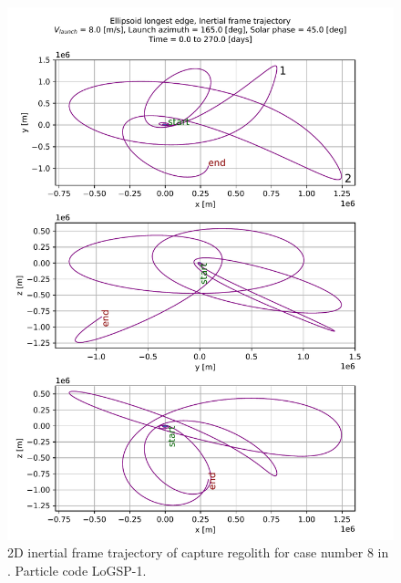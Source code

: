 \FloatBarrier
\begin{figure}[htb]
\centering
\captionsetup{justification=centering}
\includegraphics[angle=90, width=\textwidth, height=\textheight, keepaspectratio=true]{longest_edge_perturbations/3.2Density_1cmSize/2dTrajectory_8ms_165Azimuth_45solarPhase_inertialFrame_edit.pdf}
\caption{2D inertial frame trajectory of capture regolith for case number 8 in . Particle code LoGSP-1.}
\label{fig:LoGSP_1_capture_case_8_2d_traj_inertialFrame}
\end{figure}
\FloatBarrier
